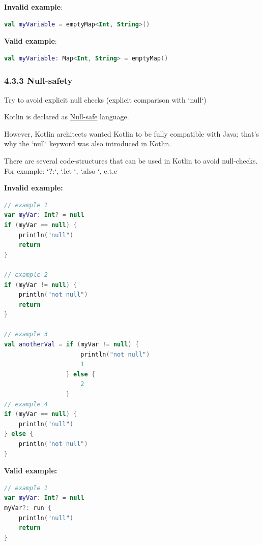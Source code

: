 {{{{\textbf{Invalid example}:

\begin{lstlisting}[language=Kotlin]
val myVariable = emptyMap<Int, String>() 
\end{lstlisting}


\textbf{Valid example}:

\begin{lstlisting}[language=Kotlin]
val myVariable: Map<Int, String> = emptyMap() 
\end{lstlisting}


\subsubsection*{\textbf{4.3.3 Null-safety}}
\leavevmode\newline

\label{sec:4.3.3}



Try to avoid explicit null checks (explicit comparison with `null`) 

Kotlin is declared as \href{https://kotlinlang.org/docs/reference/null-safety.html}{Null-safe} language.

However, Kotlin architects wanted Kotlin to be fully compatible with Java; that's why the `null` keyword was also introduced in Kotlin. 



There are several code-structures that can be used in Kotlin to avoid null-checks. For example: `?:`,  `.let {}`, `.also {}`, e.t.c



\textbf{Invalid example:}

\begin{lstlisting}[language=Kotlin]
// example 1
var myVar: Int? = null
if (myVar == null) {
    println("null")
    return
}

// example 2
if (myVar != null) {
    println("not null")
    return
}

// example 3
val anotherVal = if (myVar != null) {
                     println("not null")
                     1
                 } else {
                     2
                 }
// example 4
if (myVar == null) {
    println("null")
} else {
    println("not null")
}
\end{lstlisting}


\textbf{Valid example:}

\begin{lstlisting}[language=Kotlin]
// example 1
var myVar: Int? = null
myVar?: run {
    println("null")
    return
}


\end{lstlisting}}}}}
